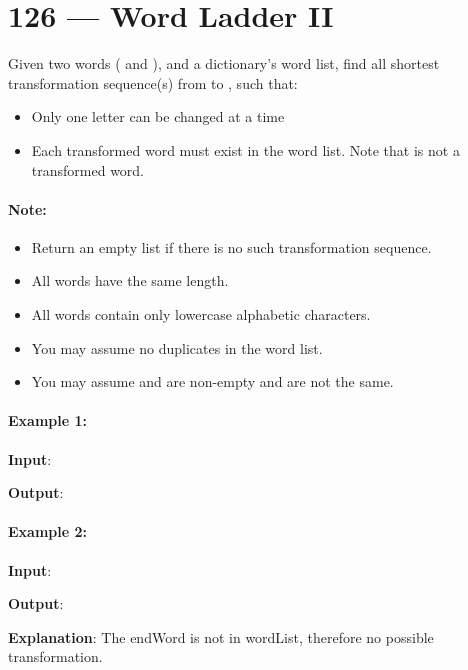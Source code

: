 \section{126 --- Word Ladder II}
Given two words ( and ), and a dictionary's word list, find all shortest transformation sequence(s) from  to , such that:
\begin{itemize}
\item Only one letter can be changed at a time
\item Each transformed word must exist in the word list. Note that  is not a transformed word.
\end{itemize}
\paragraph{Note:}
\begin{itemize}
\item Return an empty list if there is no such transformation sequence.
\item All words have the same length.
\item All words contain only lowercase alphabetic characters.
\item You may assume no duplicates in the word list.
\item You may assume  and  are non-empty and are not the same.
\end{itemize}
\paragraph{Example 1:}
\begin{flushleft}
\textbf{Input}: 




\textbf{Output}:



\end{flushleft}

\paragraph{Example 2:}
\begin{flushleft}
\textbf{Input}: 




\textbf{Output}: 

\fcj{[]}


\textbf{Explanation}: The endWord  is not in wordList, therefore no possible transformation.
\end{flushleft}
